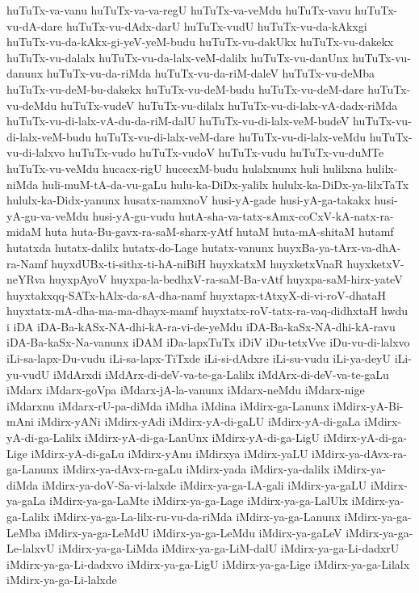 {huTuTx-va-vanu
huTuTx-va-va-regU
huTuTx-va-veMdu
huTuTx-vavu
huTuTx-vu-dA-dare
huTuTx-vu-dAdx-darU
huTuTx-vudU
huTuTx-vu-da-kAkxgi
huTuTx-vu-da-kAkx-gi-yeV-yeM-budu
huTuTx-vu-dakUkx
huTuTx-vu-dakekx
huTuTx-vu-dalalx
huTuTx-vu-da-lalx-veM-dalilx
huTuTx-vu-danUnx
huTuTx-vu-danunx
huTuTx-vu-da-riMda
huTuTx-vu-da-riM-daleV
huTuTx-vu-deMba
huTuTx-vu-deM-bu-dakekx
huTuTx-vu-deM-budu
huTuTx-vu-deM-dare
huTuTx-vu-deMdu
huTuTx-vudeV
huTuTx-vu-dilalx
huTuTx-vu-di-lalx-vA-dadx-riMda
huTuTx-vu-di-lalx-vA-du-da-riM-dalU
huTuTx-vu-di-lalx-veM-budeV
huTuTx-vu-di-lalx-veM-budu
huTuTx-vu-di-lalx-veM-dare
huTuTx-vu-di-lalx-veMdu
huTuTx-vu-di-lalxvo
huTuTx-vudo
huTuTx-vudoV
huTuTx-vudu
huTuTx-vu-duMTe
huTuTx-vu-veMdu
hucacx-rigU
hucecxM-budu
hulalxnunx
huli
hulilxna
hulilx-niMda
huli-muM-tA-da-vu-gaLu
hulu-ka-DiDx-yalilx
hululx-ka-DiDx-ya-lilxTaTx
hululx-ka-Didx-yanunx
husatx-namxnoV
husi-yA-gade
husi-yA-ga-takakx
husi-yA-gu-va-veMdu
husi-yA-gu-vudu
hutA-sha-va-tatx-sAmx-coCxV-kA-natx-ra-midaM
huta
huta-Bu-gavx-ra-saM-sharx-yAtf
hutaM
huta-mA-shitaM
hutamf
hutatxda
hutatx-dalilx
hutatx-do-Lage
hutatx-vanunx
huyxBa-ya-tArx-va-dhA-ra-Namf
huyxdUBx-ti-sithx-ti-hA-niBiH
huyxkatxM
huyxketxVnaR
huyxketxV-neYRva
huyxpAyoV
huyxpa-la-bedhxV-ra-saM-Ba-vAtf
huyxpa-saM-hirx-yateV
huyxtakxqq-SATx-hAlx-da-sA-dha-namf
huyxtapx-tAtxyX-di-vi-roV-dhataH
huyxtatx-mA-dha-ma-ma-dhayx-mamf
huyxtatx-roV-tatx-ra-vaq-didhxtaH
hwdu
i
iDA
iDA-Ba-kASx-NA-dhi-kA-ra-vi-de-yeMdu
iDA-Ba-kaSx-NA-dhi-kA-ravu
iDA-Ba-kaSx-Na-vanunx
iDAM
iDa-lapxTuTx
iDiV
iDu-tetxVve
iDu-vu-di-lalxvo
iLi-sa-lapx-Du-vudu
iLi-sa-lapx-TiTxde
iLi-si-dAdxre
iLi-su-vudu
iLi-ya-deyU
iLi-yu-vudU
iMdArxdi
iMdArx-di-deV-va-te-ga-Lalilx
iMdArx-di-deV-va-te-gaLu
iMdarx
iMdarx-goVpa
iMdarx-jA-la-vanunx
iMdarx-neMdu
iMdarx-nige
iMdarxnu
iMdarx-rU-pa-diMda
iMdha
iMdina
iMdirx-ga-Lanunx
iMdirx-yA-Bi-mAni
iMdirx-yANi
iMdirx-yAdi
iMdirx-yA-di-gaLU
iMdirx-yA-di-gaLa
iMdirx-yA-di-ga-Lalilx
iMdirx-yA-di-ga-LanUnx
iMdirx-yA-di-ga-LigU
iMdirx-yA-di-ga-Lige
iMdirx-yA-di-gaLu
iMdirx-yAnu
iMdirxya
iMdirx-yaLU
iMdirx-ya-dAvx-ra-ga-Lanunx
iMdirx-ya-dAvx-ra-gaLu
iMdirx-yada
iMdirx-ya-dalilx
iMdirx-ya-diMda
iMdirx-ya-doV-Sa-vi-lalxde
iMdirx-ya-ga-LA-gali
iMdirx-ya-gaLU
iMdirx-ya-gaLa
iMdirx-ya-ga-LaMte
iMdirx-ya-ga-Lage
iMdirx-ya-ga-LalUlx
iMdirx-ya-ga-Lalilx
iMdirx-ya-ga-La-lilx-ru-vu-da-riMda
iMdirx-ya-ga-Lanunx
iMdirx-ya-ga-LeMba
iMdirx-ya-ga-LeMdU
iMdirx-ya-ga-LeMdu
iMdirx-ya-gaLeV
iMdirx-ya-ga-Le-lalxvU
iMdirx-ya-ga-LiMda
iMdirx-ya-ga-LiM-dalU
iMdirx-ya-ga-Li-dadxrU
iMdirx-ya-ga-Li-dadxvo
iMdirx-ya-ga-LigU
iMdirx-ya-ga-Lige
iMdirx-ya-ga-Lilalx
iMdirx-ya-ga-Li-lalxde
}
